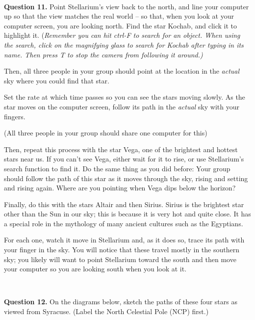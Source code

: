 \documentclass[11pt]{article}
\begin{document}
	\hrulefill\\
	
	\textbf{Question 11.} Point Stellarium's view back to the north, and line your computer up so that the view matches the real world --
	so that, when you look at your computer screen, you are looking north. Find the star Kochab, and click it to highlight it. ({\it Remember you can hit ctrl-F to search for an object. When using the search, click on the magnifying glass to search for Kochab after typing in its name. Then press T to stop the camera from following it around.)} 
	
	Then, all three people
	in your group should point at the location in the {\it actual} sky where you could find that star. 
	
	Set the rate at which time passes so you can see the stars moving slowly. As the star moves on the computer screen, follow
	its path in the {\it actual} sky with your fingers.
	
	(All three people in your group should share one computer for this)
	
	Then, repeat this process with the star Vega, one of the brightest and hottest stars near us. If you can't see Vega, either wait for it to rise, or use Stellarium's search function to find it. Do the same thing as you did before: Your group
	should follow the path of this star as it moves through the sky, rising and setting and rising again. Where are you pointing when Vega dips below the horizon? 
	
	Finally, do this with the stars Altair and then Sirius. Sirius is the brightest star other than the Sun in our sky; this is because it is very hot and quite close. It has a special role in the mythology of many ancient cultures such as the Egyptians.
	
	For each one, watch it move in Stellarium and, as it does so, trace its path with your finger in the sky. You will notice that these travel mostly in the southern sky; you likely will want to point Stellarium toward the south and then move your computer so you are looking south when you look at it.
	
	
	
	\vspace*{1.5cm}
	
	\hrulefill\\
	
	
	
	\newpage
	
	\textbf{Question 12.} On the diagrams below, sketch the paths of these four stars as viewed from Syracuse. (Label the North Celestial Pole (NCP) first.)
	
\end{document}
